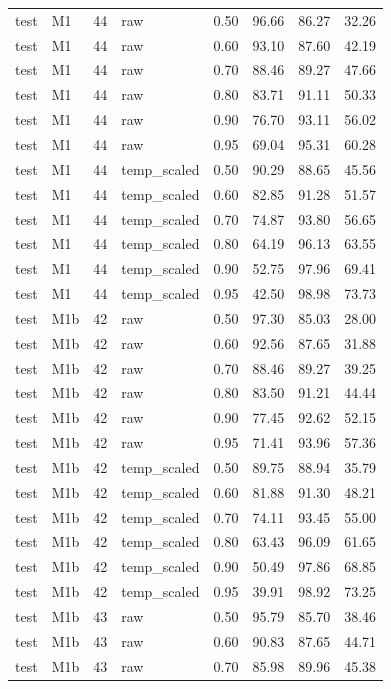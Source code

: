 \begin{tabular}{llrlrrrr}
test & M1 & 44 & raw & 0.50 & 96.66 & 86.27 & 32.26 \\
test & M1 & 44 & raw & 0.60 & 93.10 & 87.60 & 42.19 \\
test & M1 & 44 & raw & 0.70 & 88.46 & 89.27 & 47.66 \\
test & M1 & 44 & raw & 0.80 & 83.71 & 91.11 & 50.33 \\
test & M1 & 44 & raw & 0.90 & 76.70 & 93.11 & 56.02 \\
test & M1 & 44 & raw & 0.95 & 69.04 & 95.31 & 60.28 \\
test & M1 & 44 & temp\_scaled & 0.50 & 90.29 & 88.65 & 45.56 \\
test & M1 & 44 & temp\_scaled & 0.60 & 82.85 & 91.28 & 51.57 \\
test & M1 & 44 & temp\_scaled & 0.70 & 74.87 & 93.80 & 56.65 \\
test & M1 & 44 & temp\_scaled & 0.80 & 64.19 & 96.13 & 63.55 \\
test & M1 & 44 & temp\_scaled & 0.90 & 52.75 & 97.96 & 69.41 \\
test & M1 & 44 & temp\_scaled & 0.95 & 42.50 & 98.98 & 73.73 \\
test & M1b & 42 & raw & 0.50 & 97.30 & 85.03 & 28.00 \\
test & M1b & 42 & raw & 0.60 & 92.56 & 87.65 & 31.88 \\
test & M1b & 42 & raw & 0.70 & 88.46 & 89.27 & 39.25 \\
test & M1b & 42 & raw & 0.80 & 83.50 & 91.21 & 44.44 \\
test & M1b & 42 & raw & 0.90 & 77.45 & 92.62 & 52.15 \\
test & M1b & 42 & raw & 0.95 & 71.41 & 93.96 & 57.36 \\
test & M1b & 42 & temp\_scaled & 0.50 & 89.75 & 88.94 & 35.79 \\
test & M1b & 42 & temp\_scaled & 0.60 & 81.88 & 91.30 & 48.21 \\
test & M1b & 42 & temp\_scaled & 0.70 & 74.11 & 93.45 & 55.00 \\
test & M1b & 42 & temp\_scaled & 0.80 & 63.43 & 96.09 & 61.65 \\
test & M1b & 42 & temp\_scaled & 0.90 & 50.49 & 97.86 & 68.85 \\
test & M1b & 42 & temp\_scaled & 0.95 & 39.91 & 98.92 & 73.25 \\
test & M1b & 43 & raw & 0.50 & 95.79 & 85.70 & 38.46 \\
test & M1b & 43 & raw & 0.60 & 90.83 & 87.65 & 44.71 \\
test & M1b & 43 & raw & 0.70 & 85.98 & 89.96 & 45.38 \\

\end{tabular}
